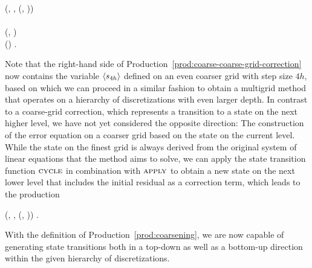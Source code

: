 \begin{bnf}
	 {
		(\bnfts{$\omega$}, \bnfsp {}, \bnfsp {}(, \bnfsp {})) \bnfor
	} \\
	\label{prod:coarse-coarse-grid-correction} \\
	 {
		(, \bnfsp {})
	} \\
	 {
		() \bnfsp {} \bnfsp {}.
	}
\end{bnf}
Note that the right-hand side of Production~\eqref{prod:coarse-coarse-grid-correction} now contains the variable $\langle s_{4h} \rangle$ defined on an even coarser grid with step size $4h$, based on which we can proceed in a similar fashion to obtain a multigrid method that operates on a hierarchy of discretizations with even larger depth.
In contrast to a coarse-grid correction, which represents a transition to a state on the next higher level, we have not yet considered the opposite direction: The construction of the error equation on a coarser grid based on the state on the current level.
While the state on the finest grid is always derived from the original system of linear equations that the method aims to solve, we can apply the state transition function $\textsc{cycle}$ in combination with $\textsc{apply}$ to obtain a new state on the next lower level that includes the initial residual as a correction term, which leads to the production
\begin{bnf}
 {
	(, \bnfsp {}, \bnfsp {}(, \bnfsp {}))
}.
\label{prod:coarsening}
\end{bnf}
With the definition of Production~\eqref{prod:coarsening}, we are now capable of generating state transitions both in a top-down as well as a bottom-up direction within the given hierarchy of discretizations.
